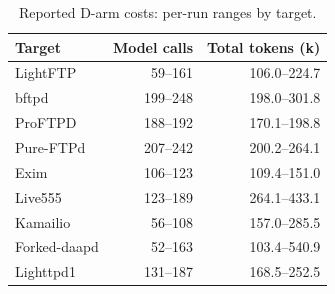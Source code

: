 \begin{table}[!tbp]
\centering\small
\caption{Reported D-arm costs: per-run ranges by target.}
\label{tab:observed_costs}
\begin{tabular}{lrr}
\toprule
Target & Model calls & Total tokens (k) \\
\midrule
LightFTP & 59--161 & 106.0--224.7 \\
bftpd & 199--248 & 198.0--301.8 \\
ProFTPD & 188--192 & 170.1--198.8 \\
Pure-FTPd & 207--242 & 200.2--264.1 \\
Exim & 106--123 & 109.4--151.0 \\
Live555 & 123--189 & 264.1--433.1 \\
Kamailio & 56--108 & 157.0--285.5 \\
Forked-daapd & 52--163 & 103.4--540.9 \\
Lighttpd1 & 131--187 & 168.5--252.5 \\
\bottomrule
\end{tabular}
\end{table}
